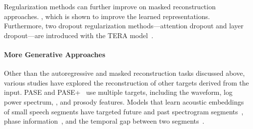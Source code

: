 Regularization methods can further improve on masked reconstruction approaches. , which is shown to improve the learned representations. Furthermore, two dropout regularization methods---attention dropout and layer dropout---are introduced with the TERA model~\cite{liu2021tera, luo2021drop}. 


\paragraph{More Generative Approaches}
Other than the autoregressive and masked reconstruction tasks discussed above, various studies have explored the reconstruction of other targets derived from the input. PASE and PASE+~\cite{pascual2019learning,ravanelli2020multi} use multiple targets, including the waveform, log power spectrum, , and prosody features. Models that learn acoustic embeddings of small speech segments have targeted future and past spectrogram segments~\cite{chung2018speech2vec, tagliasacchi2019self, tagliasacchi2020pre}, phase information~\cite{quitry2019learning}, and the temporal gap between two segments~\cite{tagliasacchi2019self, tagliasacchi2020pre}.



